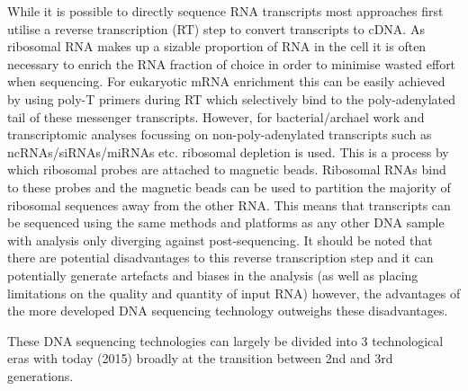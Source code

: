 While it is possible to directly sequence RNA transcripts \citep{Ozsolak2009} most approaches first utilise a reverse transcription (RT)
step to convert transcripts to cDNA. As ribosomal RNA makes up a sizable proportion of RNA in the cell
it is often necessary to enrich the RNA fraction of choice in order to minimise wasted effort when
sequencing.  For eukaryotic mRNA enrichment this can be easily achieved by
using poly-T primers during RT which selectively bind to the poly-adenylated tail of these messenger 
transcripts.  However, for bacterial/archael work and transcriptomic analyses focussing on non-poly-adenylated
transcripts such as ncRNAs/siRNAs/miRNAs etc. ribosomal depletion is used.  This is a process by which 
ribosomal probes are attached to magnetic beads. Ribosomal RNAs bind to these probes and the magnetic
beads can be used to partition the majority of ribosomal sequences away from the other RNA.
This means that transcripts can be sequenced using the same methods and platforms as any other DNA sample with analysis only diverging against post-sequencing.
It should be noted that there are potential disadvantages to this reverse transcription step and it
can potentially generate artefacts and biases in the analysis (as well as placing limitations on the quality
and quantity of input RNA) \citep{Ozsolak2011} however, the advantages of the more developed DNA sequencing technology outweighs these
disadvantages.


These DNA sequencing technologies can largely be divided into 3 technological eras with today (2015) 
broadly at the transition between 2nd and 3rd generations.



